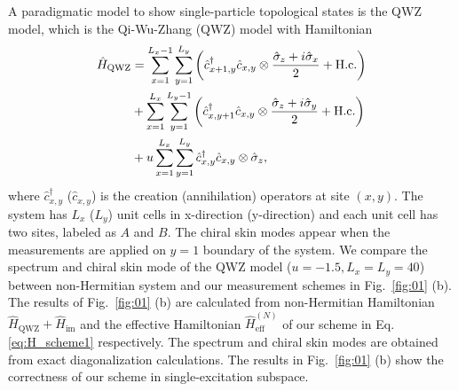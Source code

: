 \documentclass[longbibliography, aps, prx, amsmath, amssymb, amsfonts, twocolumn,superscriptaddress, footinbib]{revtex4-1}
\begin{document}
	A paradigmatic model to show single-particle topological states is the QWZ model, which is the Qi-Wu-Zhang (QWZ) model with Hamiltonian
	\begin{align}
		\hat{H}_{\text{QWZ}} &=  \sum_{{x}=1}^{L_{x}-1} \sum_{{y}=1}^{L_{y}}\left(\hat{c}_{{x}+1, {y}}^{\dagger} \hat{c}_{{x}, {y}} \otimes \frac{\hat{\sigma}_{z}+i \hat{\sigma}_{x}}{2}+\mathrm{H.c.}\right) \notag\\
		& +\sum_{{x}=1}^{L_{x}} \sum_{{y}=1}^{L_{y}-1}\left(\hat{c}_{{x}, {y}+1}^{\dagger} \hat{c}_{{x}, {y}} \otimes \frac{\hat{\sigma}_{z}+i \hat{\sigma}_{y}}{2}+\mathrm{H.c.}\right) \notag\\
		& +u \sum_{{x}=1}^{L_{x}} \sum_{{y}=1}^{L_{y}} \hat{c}_{{x}, {y}}^{\dagger} \hat{c}_{{x}, {y}} \otimes \hat{\sigma}_{z},
	\end{align}
	where $\hat{c}_{{x}, {y}}^{\dagger}$ ($\hat{c}_{{x}, {y}}$) is the creation (annihilation) operators at site $({x},{y})$. The system has $L_x$ ($L_y$) unit cells in x-direction (y-direction) and each unit cell has two sites, labeled as $A$ and $B$. 
	The chiral skin modes appear when the measurements are applied on $y=1$ boundary of the system. We compare the spectrum and chiral skin mode of the QWZ model ($u=-1.5, L_x=L_y=40$) between non-Hermitian system and our measurement schemes in Fig.~\ref{fig:01} (b). The results of Fig.~\ref{fig:01} (b) are calculated from non-Hermitian Hamiltonian $\hat{H}_{\text{QWZ}} + \hat{H}_{\text{im}}$ and the effective Hamiltonian $\hat{H}_{\text{eff}}^{(N)}$ of our scheme in Eq.\ref{eq:H_scheme1} respectively. 
	The spectrum and chiral skin modes are obtained from exact diagonalization calculations. The results in Fig.~\ref{fig:01} (b) show the correctness of our scheme in single-excitation subspace.
\end{document}
